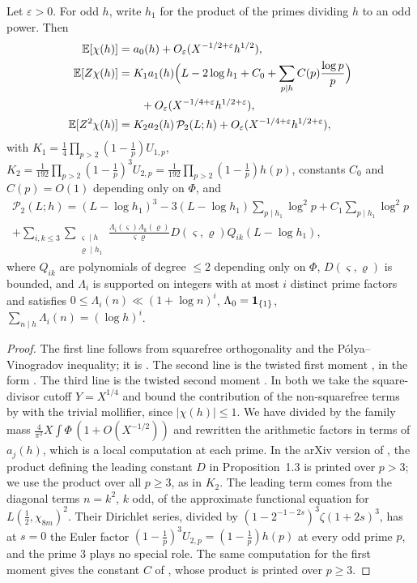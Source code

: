 \documentclass[11pt,colorlinks]{charlie}
\begin{document}
\begin{lemma}[Soundararajan]\label{lem:sound}
Let $\varepsilon>0$. For odd $h$, write $h_1$ for the product of the primes dividing $h$ to an odd power. Then
\begin{align*}
 \mathbb{E}[\chi(h)]&=a_0(h)+O_\varepsilon(X^{-1/2+\varepsilon}h^{1/2}),\\
 \mathbb{E}[Z\chi(h)]&=K_1a_1(h)\Big(L-2\log h_1+C_0+\sum_{p\mid h}C(p)\frac{\log p}p\Big)\\
 &\qquad+O_\varepsilon(X^{-1/4+\varepsilon}h^{1/2+\varepsilon}),\\
 \mathbb{E}[Z^2\chi(h)]&=K_2a_2(h)\,\mathcal P_2(L;h)+O_\varepsilon(X^{-1/4+\varepsilon}h^{1/2+\varepsilon}),
\end{align*}
with $K_1=\frac14\prod_{p>2}(1-\frac1p)U_{1,p}$, $K_2=\frac1{192}\prod_{p>2}(1-\frac1p)^3U_{2,p}=\frac1{192}\prod_{p>2}(1-\frac1p)h(p)$, constants $C_0$ and $C(p)=O(1)$ depending only on $\Phi$, and
\begin{multline*}
 \mathcal P_2(L;h)=(L-\log h_1)^3-3(L-\log h_1)\sum_{p\mid h_1}\log^2p+C_1\sum_{p\mid h_1}\log^2p\\
 +\sum_{i,k\le3}\sum_{\substack{\varsigma\mid h\\ \varrho\mid h_1}}\frac{\Lambda_i(\varsigma)\Lambda_k(\varrho)}{\varsigma\varrho}D(\varsigma,\varrho)Q_{ik}(L-\log h_1),
\end{multline*}
where $Q_{ik}$ are polynomials of degree $\le2$ depending only on $\Phi$, $D(\varsigma,\varrho)$ is bounded, and $\Lambda_i$ is supported on integers with at most $i$ distinct prime factors and satisfies $0\le\Lambda_i(n)\ll(1+\log n)^i$, $\Lambda_0=\mathbf{1}_{\{1\}}$, $\sum_{n\mid h}\Lambda_i(n)=(\log h)^i$.
\end{lemma}
\begin{proof}
The first line follows from squarefree orthogonality and the P\'olya--Vinogradov inequality; it is \cite[Lemma~3.2]{Gao2}. The second line is the twisted first moment \cite[Proposition~1.2]{Sound}, in the form \cite[Lemma~3.3]{Gao2}. The third line is the twisted second moment \cite[Proposition~1.3]{Sound}. In both we take the square-divisor cutoff $Y=X^{1/4}$ and bound the contribution of the non-squarefree terms by \cite[Proposition~1.1]{Sound} with the trivial mollifier, since $|\chi(h)|\le1$. We have divided by the family mass $\frac4{\pi^2}X\int\Phi\,(1+O(X^{-1/2}))$ and rewritten the arithmetic factors in terms of $a_j(h)$, which is a local computation at each prime. In the arXiv version of \cite{Sound}, the product defining the leading constant $D$ in Proposition~1.3 is printed over $p>3$; we use the product over all $p\ge3$, as in $K_2$. The leading term comes from the diagonal terms $n=k^2$, $k$ odd, of the approximate functional equation for $L(\frac12,\chi_{8m})^2$. Their Dirichlet series, divided by $(1-2^{-1-2s})^3\zeta(1+2s)^3$, has at $s=0$ the Euler factor $(1-\frac1p)^3U_{2,p}=(1-\frac1p)h(p)$ at every odd prime $p$, and the prime $3$ plays no special role. The same computation for the first moment gives the constant $C$ of \cite[Proposition~1.2]{Sound}, whose product is printed over $p\ge3$.
\end{proof}
\end{document}
